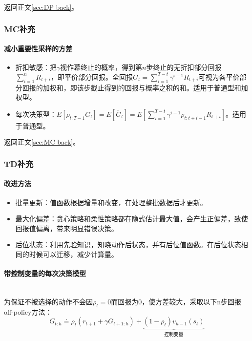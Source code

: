 \documentclass[
12pt, %
a4paper, 
oneside, %
headinclude,footinclude, %
]{scrartcl}
\begin{document}
返回正文\ref{sec:DP back}。
\subsubsection[MC补充]{MC补充}
\paragraph{减小重要性采样的方差}\label{sec:MC}
\begin{itemize}
\item 折扣敏感：把$ \gamma $视作幕终止的概率，得到第$ n $步终止的无折扣部分回报$ \sum_{i = 1}^n R_{t + i} $，即平价部分回报。全回报$ G_t = \sum_{i = 1}^{T - t} \gamma^{i - 1}R_{t + i} $可视为各平价部分回报的加权和，即该步截止得到的回报与概率之积的和。适用于普通型和加权型。
\item 每次决策型：$ E[\rho_{t:T - 1}G_t] = E[\tilde{G_t}] = E[\sum_{i = 1}^{T - t} \gamma^{i - 1} \rho_{t:t + i - 1}R_{t + i}] $。适用于普通型。
\end{itemize}

返回正文\ref{sec:MC back}。
\subsubsection[TD补充]{TD补充}\label{sec:TD}
\paragraph{改进方法}
\begin{itemize}
\item 批量更新：值函数根据增量和改变，在处理整批数据后才更新。
\item 最大化偏差：贪心策略和柔性策略都在隐式估计最大值，会产生正偏差，致使回报值偏离，带来明显错误决策。
\item 后位状态：利用先验知识，知晓动作后状态，并有后位值函数。在后位状态相同的时候可以迁移，减少计算量。
\end{itemize}
\paragraph{带控制变量的每次决策模型}~\\

为保证不被选择的动作不会因$ \rho_t = 0 $而回报为$ 0 $，使方差较大，采取以下n步回报off-policy方法：
$$ G_{t:h} \doteq \rho_t (r_{t + 1} + \gamma G_{t + 1:h}) + \underbrace{(1 - \rho_t) v_{h - 1}(s_t)}_{\text{控制变量}} $$
\end{document}
